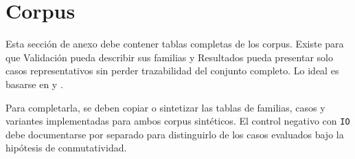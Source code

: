 
\section{Corpus}

Esta sección de anexo debe contener tablas completas de los corpus. Existe para que Validación pueda describir sus familias y Resultados pueda presentar solo casos representativos sin perder trazabilidad del conjunto completo. Lo ideal es basarse en  y .

Para completarla, se deben copiar o sintetizar las tablas de familias, casos y variantes implementadas para ambos corpus sintéticos. El control negativo con \texttt{IO} debe documentarse por separado para distinguirlo de los casos evaluados bajo la hipótesis de conmutatividad.
